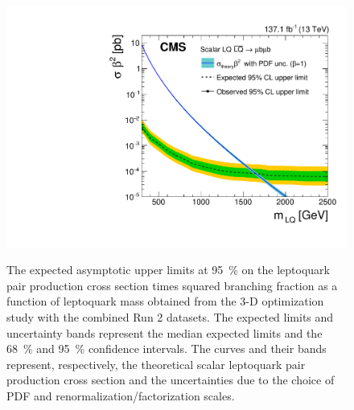 \begin{figure}[H]
    \centering
    {\includegraphics[width=.48\textwidth]{Images/Analysis/3D_Opt_Limits/BR_Sigma_MuMu_2016-2018.pdf}}
    \caption{The expected asymptotic upper limits at \SI{95}{\%} \CL on the leptoquark pair production cross section times squared branching fraction as a function of leptoquark mass obtained from the 3-D optimization study with the combined Run 2 datasets. The expected limits and uncertainty bands represent the median expected limits and the \SI{68}{\%} and \SI{95}{\%} confidence intervals. The  curves and their bands represent, respectively, the theoretical scalar leptoquark pair production cross section and the uncertainties due to the choice of PDF and renormalization/factorization scales.}
    \label{figapp:cutandcountlimitsrun2}
\end{figure}